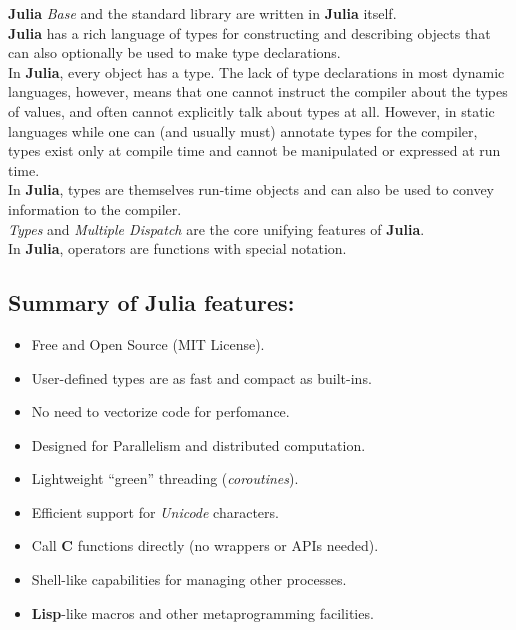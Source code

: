 \documentclass[
]{article}
\providecommand{\tightlist}{%
  \setlength{\itemsep}{0pt}\setlength{\parskip}{0pt}}
\begin{document}
\textbf{Julia} \emph{Base} and the standard library are written in
\textbf{Julia} itself.\\
\textbf{Julia} has a rich language of types for constructing and
describing objects that can also optionally be used to make type
declarations.\\
In \textbf{Julia}, every object has a type. The lack of type
declarations in most dynamic languages, however, means that one cannot
instruct the compiler about the types of values, and often cannot
explicitly talk about types at all. However, in static languages while
one can (and usually must) annotate types for the compiler, types exist
only at compile time and cannot be manipulated or expressed at run
time.\\
In \textbf{Julia}, types are themselves run-time objects and can also be
used to convey information to the compiler.\\
\emph{Types} and \emph{Multiple Dispatch} are the core unifying features
of \textbf{Julia}.\\
In \textbf{Julia}, operators are functions with special notation.

\hypertarget{summary-of-julia-features}{%
\subsection{Summary of Julia
features:}\label{summary-of-julia-features}}

\begin{itemize}
\tightlist
\item
  Free and Open Source (MIT License).
\item
  User-defined types are as fast and compact as built-ins.
\item
  No need to vectorize code for perfomance.
\item
  Designed for Parallelism and distributed computation.
\item
  Lightweight ``green'' threading (\emph{coroutines}).
\item
  Efficient support for \emph{Unicode} characters.
\item
  Call \textbf{C} functions directly (no wrappers or APIs needed).
\item
  Shell-like capabilities for managing other processes.
\item
  \textbf{Lisp}-like macros and other metaprogramming facilities.
\end{itemize}

\newpage
\end{document}
